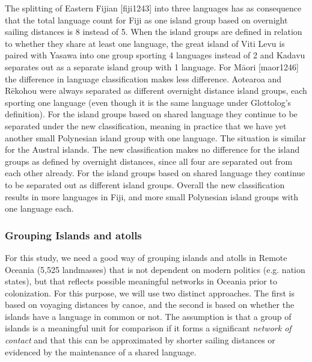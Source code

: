 \documentclass[a4paper,10pt]{article} %
\begin{document}
The splitting of Eastern Fijian [fiji1243] into three languages has as consequence that the total language count for Fiji as one island group based on overnight sailing distances is 8 instead of 5. When the island groups are defined in relation to whether they share at least one language, the great island of Viti Levu is paired with Yasawa into one group sporting 4 languages instead of 2 and Kadavu separates out as a separate island group with 1 language. For M\={a}ori [maor1246] the difference in language classification makes less difference. Aotearoa and  R\={e}kohou were always separated as different overnight distance island groups, each sporting one language (even though it is the same language under Glottolog's definition). For the island groups based on shared language they continue to be separated under the new classification, meaning in practice that we have yet another small Polynesian island group with one language. The situation is similar for the Austral islands. The new classification makes no difference for the island groups as defined by overnight distances, since all four are separated out from each other already. For the island groups based on shared language they continue to be separated out as different island groups. Overall the new classification results in more languages in Fiji, and more small Polynesian island groups with one language each.


\FloatBarrier
\subsubsection{Grouping Islands and atolls}
\label{sec:island_geo}


For this study, we need a good way of grouping islands and atolls in Remote Oceania (5,525 landmasses) that is not dependent on modern politics (e.g. nation states), but that reflects possible meaningful networks in Oceania prior to colonization. For this purpose, we will use two distinct approaches. The first is based on voyaging distances by canoe, and the second is based on whether the islands have a language in common or not. The assumption is that a group of islands is a meaningful unit for comparison if it forms a significant \textit{network of contact} and that this can be approximated by shorter sailing distances or evidenced by the maintenance of a shared language. 
\end{document}
